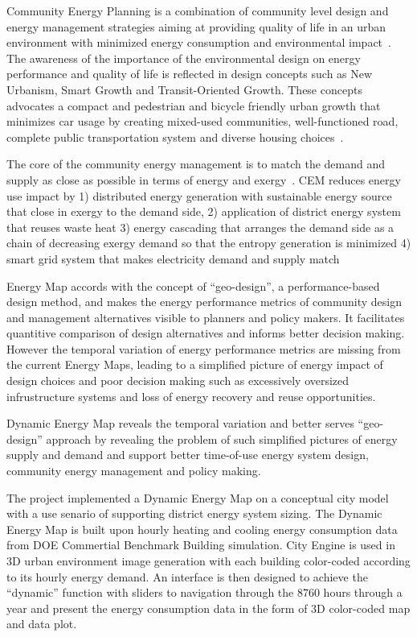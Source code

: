 \documentclass[hidelinks,12pt]{article}
\begin{document}
Community Energy Planning is a combination of community level design
and energy management strategies aiming at providing quality of life
in an urban environment with minimized energy consumption and
environmental impact~\cite{Jaccard19971065}. The awareness of the
importance of the environmental design on energy performance and
quality of life is reflected in design concepts such as New Urbanism,
Smart Growth and Transit-Oriented Growth. These concepts advocates a
compact and pedestrian and bicycle friendly urban growth that
minimizes car usage by creating mixed-used communities,
well-functioned road, complete public transportation system and
diverse housing choices~\cite{smartGrowthWiki}.

The core of the community energy management is to match the demand and
supply as close as possible in terms of energy and
exergy~\cite{Dobbelsteen2013}. CEM reduces energy use impact by 1)
distributed energy generation with sustainable energy source that
close in exergy to the demand side, 2) application of district energy
system that reuses waste heat 3) energy cascading that arranges the
demand side as a chain of decreasing exergy demand so that the entropy
generation is minimized 4) smart grid system that makes electricity
demand and supply match

Energy Map accords with the concept of ``geo-design'', a
performance-based design method, and makes the energy performance
metrics of community design and management alternatives visible to
planners and policy makers. It facilitates quantitive comparison of
design alternatives and informs better decision making. However the
temporal variation of energy performance metrics are missing from the
current Energy Maps, leading to a simplified picture of energy impact
of design choices and poor decision making such as excessively
oversized infrustructure systems and loss of energy recovery and reuse
opportunities.

Dynamic Energy Map reveals the temporal variation and better serves
``geo-design'' approach by revealing the problem of such simplified
pictures of energy supply and demand and support better time-of-use
energy system design, community energy management and policy making.

The project implemented a Dynamic Energy Map on a conceptual city
model with a use senario of supporting district energy system
sizing. The Dynamic Energy Map is built upon hourly heating and
cooling energy consumption data from DOE Commertial Benchmark Building
simulation. City Engine is used in 3D urban environment image
generation with each building color-coded according to its hourly
energy demand. An interface is then designed to achieve the
``dynamic'' function with sliders to navigation through the 8760 hours
through a year and present the energy consumption data in the form of
3D color-coded map and data plot.
\end{document}
